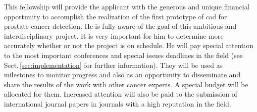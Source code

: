This fellowship will provide the applicant with the generous and unique financial opportunity to accomplish the realization of the first prototype of \ac{cad} for prostate cancer detection.
He is fully aware of the goal of this ambitious and interdisciplinary project.
It is very important for him to determine more accurately whether or not the project is on schedule. 
He will pay special attention to the most important conferences and special issues deadlines in the field (see Sect.\,\ref{sec:implementation} for further information). 
They will be used as milestones to monitor progress and also as an opportunity to disseminate and share the results of the work with other cancer experts.
A special budget will be allocated for them. 
Increased  attention will also be paid to the submission of international journal papers in journals with a high reputation in the field.

